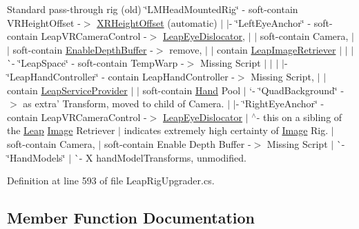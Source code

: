 Standard pass-\/through rig (old) \char`\"{}\+L\+M\+Head\+Mounted\+Rig\char`\"{} -\/ soft-\/contain V\+R\+Height\+Offset -\/$>$ \mbox{\hyperlink{class_leap_1_1_unity_1_1_x_r_height_offset}{X\+R\+Height\+Offset}} (automatic) $\vert$ $\vert$-\/ \char`\"{}\+Left\+Eye\+Anchor\char`\"{} -\/ soft-\/contain Leap\+V\+R\+Camera\+Control -\/$>$ \mbox{\hyperlink{class_leap_1_1_unity_1_1_leap_eye_dislocator}{Leap\+Eye\+Dislocator}}, $\vert$ $\vert$ soft-\/contain Camera, $\vert$ $\vert$ soft-\/contain \mbox{\hyperlink{class_leap_1_1_unity_1_1_enable_depth_buffer}{Enable\+Depth\+Buffer}} -\/$>$ remove, $\vert$ $\vert$ contain \mbox{\hyperlink{class_leap_1_1_unity_1_1_leap_image_retriever}{Leap\+Image\+Retriever}} $\vert$ $\vert$ $\vert$ \`{}-\/ \char`\"{}\+Leap\+Space\char`\"{} -\/ soft-\/contain Temp\+Warp -\/$>$ Missing Script $\vert$ $\vert$ $\vert$ $\vert$-\/ \char`\"{}\+Leap\+Hand\+Controller\char`\"{} -\/ contain Leap\+Hand\+Controller -\/$>$ Missing Script, $\vert$ $\vert$ contain \mbox{\hyperlink{class_leap_1_1_unity_1_1_leap_service_provider}{Leap\+Service\+Provider}} $\vert$ $\vert$ soft-\/contain \mbox{\hyperlink{class_leap_1_1_hand}{Hand}} Pool $\vert$ `-\/ \char`\"{}\+Quad\+Background\char`\"{} -\/$>$ as \textquotesingle{}extra' Transform, moved to child of Camera. $\vert$ $\vert$-\/ \char`\"{}\+Right\+Eye\+Anchor\char`\"{} -\/ contain Leap\+V\+R\+Camera\+Control -\/$>$ \mbox{\hyperlink{class_leap_1_1_unity_1_1_leap_eye_dislocator}{Leap\+Eye\+Dislocator}} $\vert$ $^\wedge$-\/ this on a sibling of the \mbox{\hyperlink{namespace_leap_1_1_unity_1_1_leap}{Leap}} \mbox{\hyperlink{class_leap_1_1_image}{Image}} Retriever $\vert$ indicates extremely high certainty of \mbox{\hyperlink{class_leap_1_1_image}{Image}} Rig. $\vert$ soft-\/contain Camera, $\vert$ soft-\/contain Enable Depth Buffer -\/$>$ Missing Script $\vert$ \`{}-\/ \char`\"{}\+Hand\+Models\char`\"{} $\vert$ \`{}-\/ X hand\+Model\+Transforms, unmodified.

Definition at line 593 of file Leap\+Rig\+Upgrader.\+cs.



\subsection{Member Function Documentation}
\mbox{\label{class_leap_1_1_unity_1_1_old_rig_hierarchy_a494d91a3cb9d07875a4c4b50c75598fd}} 
